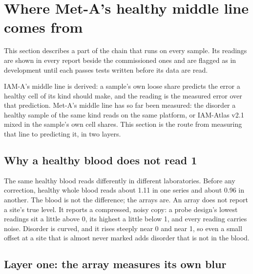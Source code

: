 
\section{Where Met-A's healthy middle line comes from}\label{sec:metaa_healthy_line}

\indevelopment{} This section describes a part of the chain that runs on every sample. Its readings are shown in every report beside the commissioned ones and are flagged as in development until each passes tests written before its data are read.

IAM-A's middle line is derived: a sample's own loose share predicts the error a healthy cell of its kind should make, and the reading is
the measured error over that prediction. Met-A's middle line has so far been measured: the disorder a healthy sample of the same kind
reads on the same platform, or IAM-Atlas v2.1 mixed in the sample's own cell shares. This section is the route from measuring that line
to predicting it, in two layers.

\subsection{Why a healthy blood does not read 1}

The same healthy blood reads differently in different laboratories. Before any correction, healthy whole blood reads about 1.11 in one
series and about 0.96 in another. The blood is not the difference; the arrays are. An array does not report a site's true level. It
reports a compressed, noisy copy: a probe design's lowest readings sit a little above 0, its highest a little below 1, and every reading
carries noise. Disorder is curved, and it rises steeply near 0 and near 1, so even a small offset at a site that is almost never marked
adds disorder that is not in the blood.

\subsection{Layer one: the array measures its own blur}


